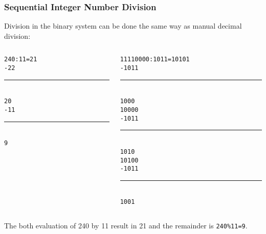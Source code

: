 \documentclass{beamer}
\begin{document}
\begin{frame}
\frametitle{Sequential Integer Number Division}

Division in the binary system can be done the same way as manual decimal division:
\bigskip
\begin{columns}
\begin{column}{0.4\textwidth}
\texttt{\phantom{-}240:11=21}\\
\texttt{-22}\\
\vspace{-8pt}
\rule[0pt]{1cm}{0.1pt}\\
\texttt{\phantom{xx}20}\\
\texttt{\phantom{x}-11}\\
\vspace{-8pt}
\rule[0pt]{1cm}{0.1pt}\\
\texttt{\phantom{xxx}9}\\
\end{column}
\hfill
\begin{column}{0.4\textwidth}
\texttt{\phantom{x}11110000:1011=10101}\\
\texttt{-1011}\\
\vspace{-8pt}
\rule[0pt]{1cm}{0.4pt}\\
\texttt{\phantom{xx}1000}\\
\texttt{\phantom{xx}10000}\\
\texttt{\phantom{xx}-1011}\\
\vspace{-8pt}
\rule[0pt]{1.4cm}{0.4pt}\\
\texttt{\phantom{xxxx}1010}\\
\texttt{\phantom{xxxx}10100}\\
\texttt{\phantom{xxxx}-1011}\\
\vspace{-8pt}
\rule[0pt]{1.8cm}{0.4pt}\\
\texttt{\phantom{xxxxx}1001}\\
\end{column}
\end{columns}
\bigskip
The both evaluation of 240 by 11 result in 21 and the remainder is \texttt{240\%11=9}.

\end{frame}
\end{document}

